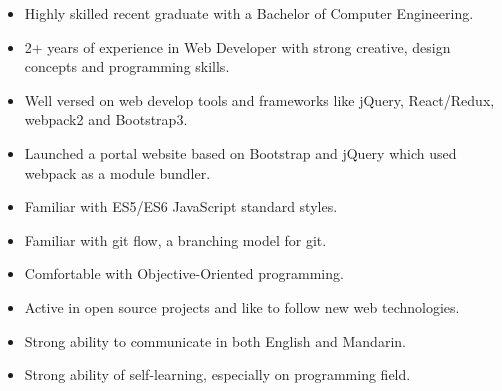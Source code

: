 

\begin{cvparagraph}
\begin{justify}
\begin{itemize}[leftmargin=2ex, nosep, noitemsep]
    \item {Highly skilled recent graduate with a Bachelor of Computer Engineering.}
    \item {2+ years of experience in Web Developer with strong creative, design concepts and programming skills.}
    \item {Well versed on web develop tools and frameworks like jQuery, React/Redux, webpack2 and Bootstrap3.}
    \item {Launched a portal website based on Bootstrap and jQuery which used webpack as a module bundler.}
    \item {Familiar with ES5/ES6 JavaScript standard styles.}
    \item {Familiar with git flow, a branching model for git.}
    \item {Comfortable with Objective-Oriented programming.}
    \item {Active in open source projects and like to follow new web technologies.}
    \item {Strong ability to communicate in both English and Mandarin.}
    \item {Strong ability of self-learning, especially on programming field.}
\end{itemize}
\end{justify}
\end{cvparagraph}



